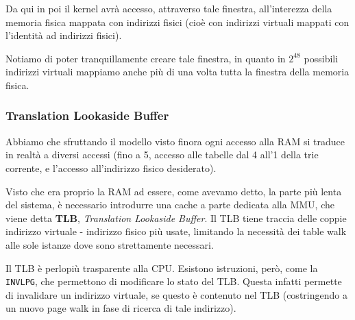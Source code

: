 \documentclass[a4paper,11pt]{article}
\begin{document}
Da qui in poi il kernel avrà accesso, attraverso tale finestra, all'interezza della memoria fisica mappata con indirizzi fisici (cioè con indirizzi virtuali mappati con l'identità ad indirizzi fisici).

Notiamo di poter tranquillamente creare tale finestra, in quanto in $2^{48}$ possibili indirizzi virtuali mappiamo anche più di una volta tutta la finestra della memoria fisica.

\subsubsection{Translation Lookaside Buffer}
Abbiamo che sfruttando il modello visto finora ogni accesso alla RAM si traduce in realtà a diversi accessi (fino a 5, accesso alle tabelle dal 4 all'1 della trie corrente, e l'accesso all'indirizzo fisico desiderato).

Visto che era proprio la RAM ad essere, come avevamo detto, la parte più lenta del sistema, è necessario introdurre una cache a parte dedicata alla MMU, che viene detta \textbf{TLB}, \textit{Translation Lookaside Buffer}.
Il TLB tiene traccia delle coppie indirizzo virtuale - indirizzo fisico più usate, limitando la necessità dei table walk alle sole istanze dove sono strettamente necessari.

Il TLB è perlopiù trasparente alla CPU.
Esistono istruzioni, però, come la \lstinline|INVLPG|, che permettono di modificare lo stato del TLB.
Questa infatti permette di invalidare un indirizzo virtuale, se questo è contenuto nel TLB (costringendo a un nuovo page walk in fase di ricerca di tale indirizzo).
\end{document}
